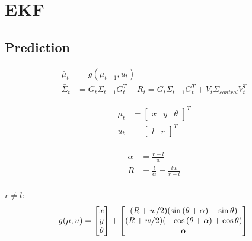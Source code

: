 \documentclass[oneside, 12pt, a4paper]{book}
\begin{document}
\chapter{EKF}

\section{Prediction}
\begin{equation}
    \begin{split}
        \bar{\mu}_t &= g(\mu_{t-1}, u_t) \\
        \bar{\Sigma}_t &= G_t \Sigma_{t-1} G_t^T + R_t = G_t \Sigma_{t-1} G_t^T + V_t \Sigma_{control} V_t^T 
    \end{split}
\end{equation}

\begin{equation}
    \begin{split}
    \mu_t &= \begin{bmatrix} x & y & \theta \end{bmatrix}^T\\
    u_t &= \begin{bmatrix}l & r \end{bmatrix}^T\\
    \end{split}
\end{equation}

\begin{equation}
    \begin{split}
        \alpha &= \frac{r-l}{w} \\
        R &= \frac{l}{\alpha} = \frac{lw}{r-l}\\
    \end{split}
\end{equation}

$r \neq l$:
\begin{equation}
    g(\mu, u) = 
    \begin{bmatrix}
        x \\ y \\ \theta
    \end{bmatrix}
    +
    \begin{bmatrix}
        (R+w/2)(\sin{(\theta + \alpha)} - \sin{\theta}) \\
        (R+w/2)(-\cos{(\theta + \alpha)} + \cos{\theta}) \\
        \alpha \\
    \end{bmatrix}\\
\end{equation}
\end{document}
